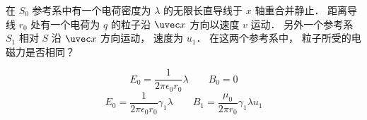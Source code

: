 
\begin{issues}
\issueDraft
\end{issues}


在 $S_0$ 参考系中有一个电荷密度为 $\lambda$ 的无限长直导线于 $x$ 轴重合并静止． 距离导线 $r_0$ 处有一个电荷为 $q$ 的粒子沿 $\uvec x$ 方向以速度 $v$ 运动． 另外一个参考系 $S_1$ 相对 $S$ 沿 $\uvec x$ 方向运动， 速度为 $u_1$． 在这两个参考系中， 粒子所受的电磁力是否相同？

\begin{equation}
E_0 = \frac{1}{2\pi\epsilon_0 r_0} \lambda
\qquad
B_0 = 0
\end{equation}
\begin{equation}
E_0 = \frac{1}{2\pi\epsilon_0 r_0} \gamma_1 \lambda
\qquad
B_1 = \frac{\mu_0}{2\pi r_0}\gamma_1 \lambda u_1
\end{equation}
